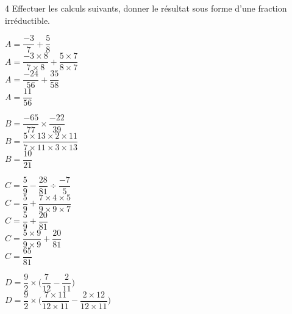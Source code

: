 \documentclass[a4paper]{book}
\begin{document}
{    \begin{exerciceNote}{4}
        Effectuer les calculs suivants, donner le résultat sous forme d'une fraction irréductible.

        \medskip

        \begin{minipage}{0.24\linewidth}
            $A = \dfrac{-3}{7} + \dfrac{5}{8}$\\[2ex]

            $A = \dfrac{-3\times8}{7\times8}+\dfrac{5\times7}{8\times7}$ \\[2ex]

            $A =\dfrac{-24}{56}+\dfrac{35}{58}$ \\[2ex]

            $A = \dfrac{11}{56}$
        \end{minipage}
        \hfill\vline\hfill
        \begin{minipage}{0.24\linewidth}
            $B = \dfrac{-65}{77}\times\dfrac{-22}{39}$\\[2ex]

            $B= \dfrac{5 \times 13 \times 2 \times 11}{7 \times 11 \times 3 \times 13}$ \\[2ex]

            $B=\dfrac{10}{21}$ 
        \end{minipage}        
        \hfill\vline\hfill
        \begin{minipage}{0.24\linewidth}
            $C = \dfrac{5}{9}-\dfrac{28}{81}\div\dfrac{-7}{5}$ \\[2ex]

            $C = \dfrac{5}{9}+\dfrac{7\times4\times5}{9\times9\times7}$ \\[2ex]

            $C = \dfrac{5}{9}+\dfrac{20}{81}$ \\[2ex]

            $C = \dfrac{5\times9}{9\times9}+\dfrac{20}{81}$ \\[2ex]

            $C = \dfrac{65}{81}$ 
        \end{minipage}
        \hfill\vline\hfill
        \begin{minipage}{0.24\linewidth}
            $D = \dfrac{9}{2}\times\bigg(\dfrac{7}{12}-\dfrac{2}{11}\bigg)$ \\[2ex]

            $D = \dfrac{9}{2}\times\bigg(\dfrac{7\times11}{12\times11}-\dfrac{2\times12}{12\times11}\bigg)$ \\[2ex]


\end{minipage}
\end{exerciceNote}}
\end{document}
